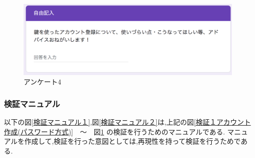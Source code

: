     \vspace{4cm}%
    \begin{figure}[H]
        \includegraphics[width=15cm]{./fig/chapter4/inspect_1/questionnaire/questionnaire_4.png}
        \caption{アンケート4}
        \label{アンケート４}
    \end{figure}

    

    





 \subsubsection{検証マニュアル}
 以下の図\ref{検証マニュアル１},図\ref{検証マニュアル２}は,上記の図\ref{検証１アカウント作成(パスワード方式)}　〜　図\ref{アンケート４} 
 の検証を行うためのマニュアルである.
 マニュアルを作成して,検証を行った意図としては,再現性を持って検証を行うためである.

 \newpage


